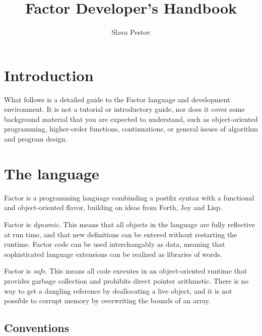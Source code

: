 \documentclass{report}
\begin{document}
\title{Factor Developer's Handbook}

\author{Slava Pestov}

\maketitle
\tableofcontents{}

\chapter*{Introduction}

What follows is a detailed guide to the Factor language and development environment. It is not a tutorial or introductory guide, nor does it cover some background material that you are expected to understand, such as object-oriented programming, higher-order functions, continuations, or general issues of algorithm and program design.

\chapter{The language}

Factor is a programming language combinding a postfix syntax with a functional and object-oriented
flavor, building on ideas from Forth, Joy and Lisp.

Factor is \emph{dynamic}. This means that all objects in the language are fully reflective at run time, and that new definitions can be entered without restarting the runtime. Factor code can be used interchangably as data, meaning that sophisticated language extensions can be realized as libraries of words.

Factor is \emph{safe}. This means all code executes in an object-oriented runtime that provides
garbage collection and prohibits direct pointer arithmetic. There is no way to get a dangling reference by deallocating a live object, and it is not possible to corrupt memory by overwriting the bounds of an array.

\section{Conventions}
\end{document}
